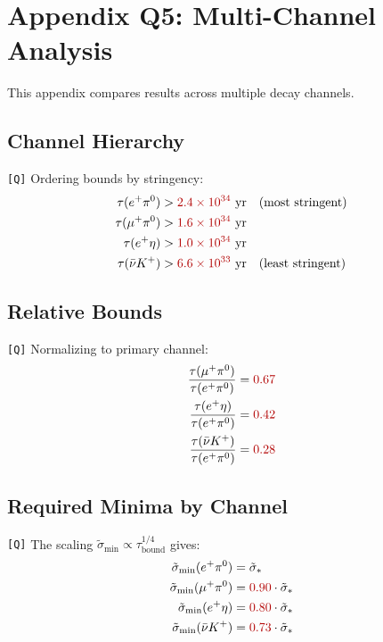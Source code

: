 \documentclass[11pt,a4paper]{article}
\newcommand{\Qval}[1]{\textcolor{red!70!black}{#1}}
\newcommand{\tagQ}{\textcolor{red!70!black}{\texttt{[Q]}}}
\theoremstyle{definition}
\begin{document}
\section{Appendix Q5: Multi-Channel Analysis}
\label{app:q5}

\begin{quarantinebox}
This appendix compares results across multiple decay channels.
\end{quarantinebox}

\subsection{Channel Hierarchy}
\label{app:channel-hier}

\tagQ{} Ordering bounds by stringency:
\begin{align}
\label{eq:hier-1}
\tau(e^+\pi^0) &> \Qval{2.4 \times 10^{34}} \text{ yr} \quad \text{(most stringent)} \\
\label{eq:hier-2}
\tau(\mu^+\pi^0) &> \Qval{1.6 \times 10^{34}} \text{ yr} \\
\label{eq:hier-3}
\tau(e^+\eta) &> \Qval{1.0 \times 10^{34}} \text{ yr} \\
\label{eq:hier-4}
\tau(\bar{\nu}K^+) &> \Qval{6.6 \times 10^{33}} \text{ yr} \quad \text{(least stringent)}
\end{align}

\subsection{Relative Bounds}
\label{app:rel-bounds}

\tagQ{} Normalizing to primary channel:
\begin{align}
\label{eq:rel-1}
\frac{\tau(\mu^+\pi^0)}{\tau(e^+\pi^0)} &= \Qval{0.67} \\
\label{eq:rel-2}
\frac{\tau(e^+\eta)}{\tau(e^+\pi^0)} &= \Qval{0.42} \\
\label{eq:rel-3}
\frac{\tau(\bar{\nu}K^+)}{\tau(e^+\pi^0)} &= \Qval{0.28}
\end{align}

\subsection{Required Minima by Channel}
\label{app:min-channel}

\tagQ{} The scaling $\tilde{\sigma}_{\min} \propto \tau_{\text{bound}}^{1/4}$ gives:
\begin{align}
\label{eq:min-ch-1}
\tilde{\sigma}_{\min}(e^+\pi^0) &= \tilde{\sigma}_{*} \\
\label{eq:min-ch-2}
\tilde{\sigma}_{\min}(\mu^+\pi^0) &= \Qval{0.90} \cdot \tilde{\sigma}_{*} \\
\label{eq:min-ch-3}
\tilde{\sigma}_{\min}(e^+\eta) &= \Qval{0.80} \cdot \tilde{\sigma}_{*} \\
\label{eq:min-ch-4}
\tilde{\sigma}_{\min}(\bar{\nu}K^+) &= \Qval{0.73} \cdot \tilde{\sigma}_{*}
\end{align}
\end{document}
